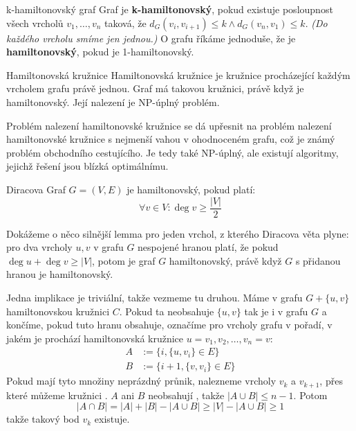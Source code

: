 \begin{definiceN}{k-hamiltonovský graf}
Graf je \textbf{k-hamiltonovský}, pokud existuje posloupnost všech vrcholů $v_1,\dots, v_n$ taková, že $d_G(v_i,v_{i+1}) \leq k \land d_G(v_n,v_1) \leq k.$ \textit{(Do každého vrcholu smíme jen jednou.)} O grafu říkáme jednoduše, že je \textbf{hamiltonovský}, pokud je 1-hamiltonovský.
\end{definiceN}

\begin{definiceN}{Hamiltonovská kružnice}
Hamiltonovská kružnice je kružnice procházející každým vrcholem grafu právě jednou. Graf má takovou kružnici, právě když je hamiltonovský. Její nalezení je NP-úplný problém.

\begin{poznamka}
Problém nalezení hamiltonovské kružnice se dá upřesnit na problém nalezení hamiltonovské kružnice s nejmenší vahou v ohodnoceném grafu, což je známý problém obchodního cestujícího. Je tedy také NP-úplný, ale existují algoritmy, jejichž řešení jsou blízká optimálnímu.
\end{poznamka}
\end{definiceN}


\begin{vetaN}{Diracova}
Graf $G=(V,E)$ je hamiltonovský, pokud platí:
$$\forall v\in V: \deg v\geq \frac{|V|}{2}$$

\medskip
\begin{dukaz}
Dokážeme o něco silnější lemma pro jeden vrchol, z kterého Diracova věta plyne: pro dva vrcholy $u,v$ v grafu $G$ nespojené hranou platí, že pokud $\deg u +\deg v \geq |V|$, potom je graf $G$ hamiltonovský, právě když $G$ s přidanou hranou je hamiltonovský.

\medskip\noindent
Jedna implikace je triviální, takže vezmeme tu druhou. Máme v grafu $G+\{u,v\}$ hamiltonovskou kružnici $C$. Pokud ta neobsahuje $\{u,v\}$ tak je i v grafu $G$ a končíme, pokud tuto hranu obsahuje, označíme pro vrcholy grafu v pořadí, v jakém je prochází hamiltonovská kružnice $u = v_1,v_2,\dots,v_n= v$:
\begin{align*}
A & :=\{i,\{u,v_i\}\in E\} \\
B & :=\{i + 1,\{v,v_i\}\in E\}
\end{align*}
Pokud mají tyto množiny neprázdný průnik, nalezneme vrcholy $v_k$ a $v_{k+1}$, přes které můžeme kružnici . $A$ ani $B$ neobsahují , takže $|A\cup B|\leq n-1$. Potom
$$|A\cap B|=|A|+|B|-|A\cup B|\geq |V|- |A\cup B|\geq 1$$
\noindent takže takový bod $v_k$ existuje.
\end{dukaz}
\end{vetaN}

